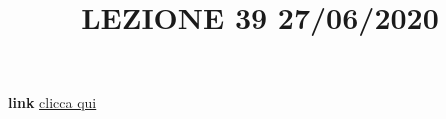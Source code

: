 \newline
\newline
\title{LEZIONE 39 27/06/2020}\newline
\textbf{link} \href{https://web.microsoftstream.com/video/fbb0c9a0-deac-4087-86d8-ea1ad609d6e4?list=user&userId=faa91214-a6f5-40d7-8875-253fd49b8ce1}{clicca qui}